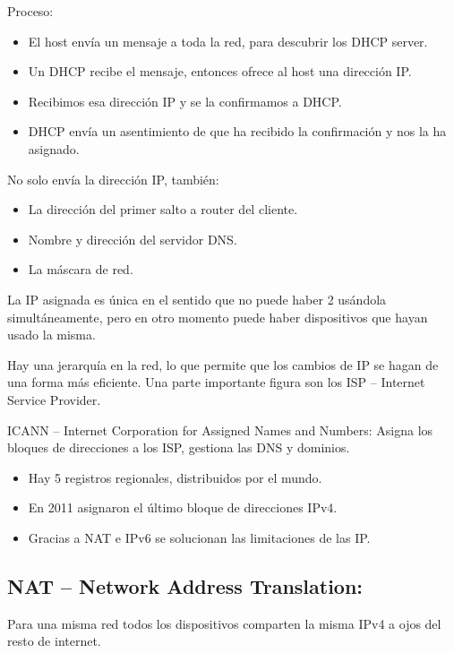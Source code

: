 \documentclass[12pt, twoside, openright]{report} %
\begin{document}
Proceso:

\begin{itemize}
	\item El host envía un mensaje a toda la red, para descubrir los DHCP
	      server.
	\item Un DHCP recibe el mensaje, entonces ofrece al host una dirección IP.
	\item Recibimos esa dirección IP y se la confirmamos a DHCP.
	\item DHCP envía un asentimiento de que ha recibido la confirmación y nos
	      la ha asignado.
\end{itemize}

No solo envía la dirección IP, también:

\begin{itemize}
	\item La dirección del primer salto a router del cliente.
	\item Nombre y dirección del servidor DNS.
	\item La máscara de red.
\end{itemize}

La IP asignada es única en el sentido que no puede haber 2 usándola
simultáneamente, pero en otro momento puede haber dispositivos que
hayan usado la misma.

Hay una jerarquía en la red, lo que permite que los cambios de IP se
hagan de una forma más eficiente. Una parte importante figura son los
ISP -- Internet Service Provider.

ICANN -- Internet Corporation for Assigned Names and Numbers: Asigna
los bloques de direcciones a los ISP, gestiona las DNS y dominios.

\begin{itemize}
	\item Hay 5 registros regionales, distribuidos por el mundo.
	\item En 2011 asignaron el último bloque de direcciones IPv4.
	\item Gracias a NAT e IPv6 se solucionan las limitaciones de las IP.
\end{itemize}


\subsection{NAT -- Network Address
	Translation:}


Para una misma red todos los dispositivos comparten la misma IPv4 a
ojos del resto de internet.
\end{document}
